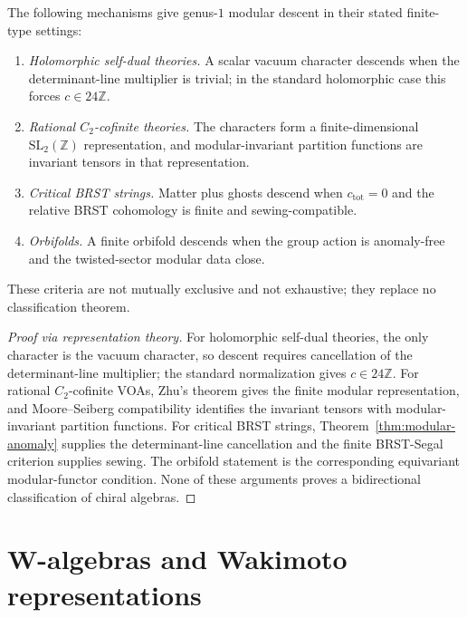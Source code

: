 \begin{theorem}\label{thm:modular-classification}
The following mechanisms give genus-$1$ modular descent in their
stated finite-type settings:

\begin{enumerate}
\item \emph{Holomorphic self-dual theories.} A scalar vacuum
 character descends when the determinant-line multiplier is trivial;
 in the standard holomorphic case this forces $c\in24\mathbb Z$.
\item \emph{Rational $C_2$-cofinite theories.} The characters form a
 finite-dimensional $\mathrm{SL}_2(\mathbb Z)$ representation, and
 modular-invariant partition functions are invariant tensors in that
 representation.
\item \emph{Critical BRST strings.} Matter plus ghosts descend when
 $c_{\mathrm{tot}}=0$ and the relative BRST cohomology is finite and
 sewing-compatible.
\item \emph{Orbifolds.} A finite orbifold descends when the group
 action is anomaly-free and the twisted-sector modular data close.
\end{enumerate}
These criteria are not mutually exclusive and not exhaustive; they
replace no classification theorem.
\end{theorem}

\begin{proof}[Proof via representation theory]
For holomorphic self-dual theories, the only character is the vacuum
character, so descent requires cancellation of the determinant-line
multiplier; the standard normalization gives $c\in24\mathbb Z$. For
rational $C_2$-cofinite VOAs, Zhu's theorem gives the finite modular
representation, and Moore--Seiberg compatibility identifies the
invariant tensors with modular-invariant partition functions. For
critical BRST strings, Theorem~\ref{thm:modular-anomaly} supplies the
determinant-line cancellation and the finite BRST-Segal criterion
supplies sewing. The orbifold statement is the corresponding
equivariant modular-functor condition. None of these arguments proves
a bidirectional classification of chiral algebras.
\end{proof}



\section{W-algebras and Wakimoto representations}\label{sec:w-algebras-wakimoto}

